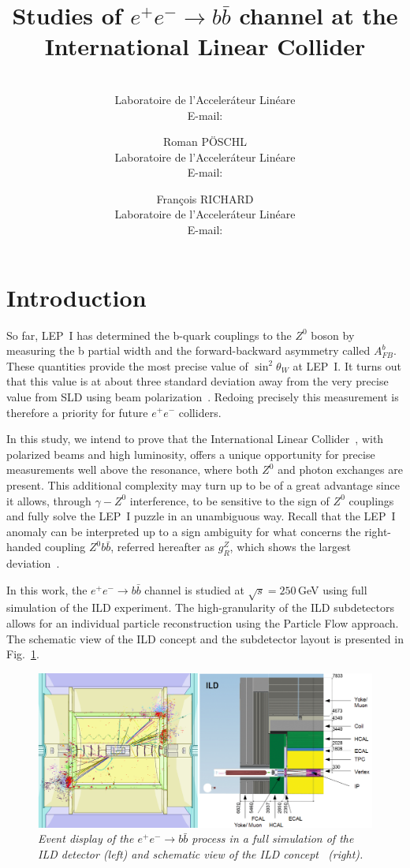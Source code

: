 \documentclass{PoS}
\title{Studies of $ e^+e^-\to b\bar{b}$ channel at the International Linear Collider}
\author{\speaker{Sviatoslav BILOKIN}\\%
        Laboratoire de l'Acceler\'ateur Lin\'eare\\
        E-mail: \email{bilokin@lal.in2p3.fr}}
\author{Roman P\"OSCHL\\
        Laboratoire de l'Acceler\'ateur Lin\'eare\\
        E-mail: \email{poeschl@lal.in2p3.fr}}
\author{Fran\c cois RICHARD\\
	Laboratoire de l'Acceler\'ateur Lin\'eare\\
	E-mail: \email{richard@lal.in2p3.fr}}
\newcommand{\afb}{$A_{FB}^b$}
\begin{document}
\section{Introduction}
So far, LEP~I has determined the b-quark couplings to the $Z^0$ boson by measuring the b partial width and the forward-backward asymmetry called \afb. These quantities provide the most precise value of $\sin^2\theta_W$ at LEP~I. It turns out that this value is at about three standard deviation away from the very precise value from SLD using beam polarization~\cite{bib:AfbSMFit}. Redoing precisely this measurement is therefore a priority for future $e^+e^-$ colliders. 

In this study, we intend to prove that the International Linear Collider~\cite{bib:ILC}, with {polarized beams and high luminosity}, offers a unique opportunity for precise measurements well above the resonance, where both $Z^0$ and photon exchanges are present. 
This additional complexity may turn up to be of a great advantage since it allows, through $\gamma - Z^0$ interference, to be sensitive to the sign of $Z^0$ couplings and fully solve the LEP~I puzzle in an unambiguous way. 
Recall that the LEP~I anomaly can be interpreted up to a sign ambiguity for what concerns the right-handed coupling $Z^0 b\bar{b}$, referred hereafter as $g_R^Z$, which shows the largest deviation~\cite{bib:RSTOP}.


In this work, the $e^+ e^-\to b\bar{b}$ channel is studied at $\sqrt{s}=250$\,GeV using full simulation of the ILD experiment.
The high-granularity of the ILD subdetectors allows for an individual particle reconstruction using the Particle Flow approach.
The schematic view of the ILD concept and the subdetector layout is presented in Fig.~\ref{fig:ILDScheme}.

\begin{figure}
	{\centering
		\includegraphics[width=0.8\linewidth]{../poster/figures/ild3.png}
		\caption{\sl Event display of the $e^+ e^-\to b\bar{b}$ process in a full simulation of the ILD detector (left) and schematic view of the ILD concept~\cite{bib:ILC} (right). }
		\label{fig:ILDScheme}
	}
\end{figure}
\end{document}
